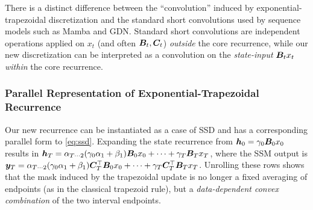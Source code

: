 \begin{remark} 
    There is a distinct difference between the ``convolution'' induced by exponential-trapezoidal discretization and the standard short convolutions used by sequence models such as Mamba and GDN.
    Standard short convolutions are independent operations applied on $x_t$ (and often ${\bm{B}}_t, {\bm{C}}_t$) \textit{outside} the core recurrence, while our new discretization can be interpreted as a convolution on the \emph{state-input} ${\bm{B}}_t x_t$ \emph{within} the core recurrence.
\end{remark}

\subsubsection{Parallel Representation of Exponential-Trapezoidal Recurrence}
\label{sec:method:trap:ssd}

Our new recurrence can be instantiated as a case of SSD and has a corresponding parallel form to \eqref{eq:ssd}.
Expanding the state recurrence from ${\bm{h}}_0 = \gamma_0 {\bm{B}}_0 x_0$ results in ${\bm{h}}_T = \alpha_{T\cdots 2}(\gamma_0\alpha_1 + \beta_1){\bm{B}}_0x_0 + \cdots + \gamma_T {\bm{B}}_T x_T$, where the SSM output is ${\bm{y}}_T = \alpha_{T\cdots 2}(\gamma_0\alpha_1 + \beta_1) {\bm{C}}_T^\top {\bm{B}}_0 x_0 + \cdots + \gamma_T {\bm{C}}_T^\top {\bm{B}}_T x_T$.
Unrolling these rows shows that the mask induced by the trapezoidal update is no longer a fixed averaging of endpoints (as in the classical trapezoid rule), but a \emph{data-dependent convex combination} of the two interval endpoints. 

